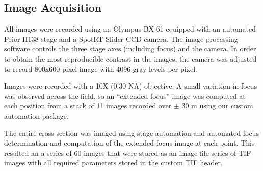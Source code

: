\subsection{Image Acquisition}

All images were recorded using an Olympus BX-61 equipped with
an automated Prior H138 stage and a SpotRT Slider CCD camera.
The  image processing software controls
the three stage axes (including focus) and the camera. In order
to obtain the most reproducible contrast in the images, the
camera was adjusted to record 800x600 pixel image with 4096
gray levels per pixel.

Images were recorded with a 10X (0.30 NA) objective.  A small
variation in focus was observed across the field, so an
``extended focus'' image was computed at each position from a
stack of 11 images recorded over $\pm$ 30 \textmu m using our
custom automation package.

The entire cross-section was imaged using stage automation
and automated focus determination and computation of the
extended focus image at each point. This resulted an a series
of 60 images that were stored as an image file series of TIF
images with all required parameters stored in the custom
TIF header.

\endinput

